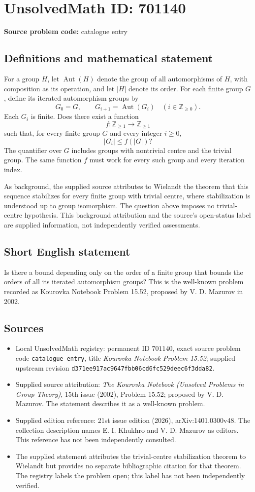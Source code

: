 \documentclass[11pt]{article}
\newcommand{\Z}{\mathbb{Z}}
\begin{document}
\section*{UnsolvedMath ID: 701140}
\textbf{Source problem code:} catalogue entry
\subsection{Definitions and mathematical statement}
For a group \(H\), let \(\operatorname{Aut}(H)\) denote the group of all automorphisms of \(H\), with composition as its operation, and let \(|H|\) denote its order. For each finite group \(G\), define its iterated automorphism groups by
\[
G_0=G,\qquad G_{i+1}=\operatorname{Aut}(G_i)\quad(i\in\Z_{\geq 0}).
\]
Each \(G_i\) is finite. Does there exist a function
\[
f:\Z_{\geq 1}\longrightarrow\Z_{\geq 1}
\]
such that, for every finite group \(G\) and every integer \(i\geq 0\),
\[
|G_i|\leq f(|G|)?
\]
The quantifier over \(G\) includes groups with nontrivial centre and the trivial group. The same function \(f\) must work for every such group and every iteration index.

As background, the supplied source attributes to Wielandt the theorem that this sequence stabilizes for every finite group with trivial centre, where stabilization is understood up to group isomorphism. The question above imposes no trivial-centre hypothesis. This background attribution and the source's open-status label are supplied information, not independently verified assessments.
\subsection{Short English statement}
Is there a bound depending only on the order of a finite group that bounds the orders of all its iterated automorphism groups? This is the well-known problem recorded as Kourovka Notebook Problem 15.52, proposed by V. D. Mazurov in 2002.
\subsection{Sources}
\begin{itemize}
\item Local UnsolvedMath registry: permanent ID \(701140\), exact source problem code \texttt{catalogue entry}, title \emph{Kourovka Notebook Problem 15.52}; supplied upstream revision \texttt{d371ee917ac9647fbb06cd6fc529deec6f3dda82}.
\item Supplied source attribution: \emph{The Kourovka Notebook (Unsolved Problems in Group Theory)}, 15th issue (2002), Problem 15.52; proposed by V. D. Mazurov. The statement describes it as a well-known problem.
\item Supplied edition reference: 21st issue edition (2026), arXiv:1401.0300v48. The collection description names E. I. Khukhro and V. D. Mazurov as editors. This reference has not been independently consulted.
\item The supplied statement attributes the trivial-centre stabilization theorem to Wielandt but provides no separate bibliographic citation for that theorem. The registry labels the problem open; this label has not been independently verified.
\end{itemize}
\end{document}
